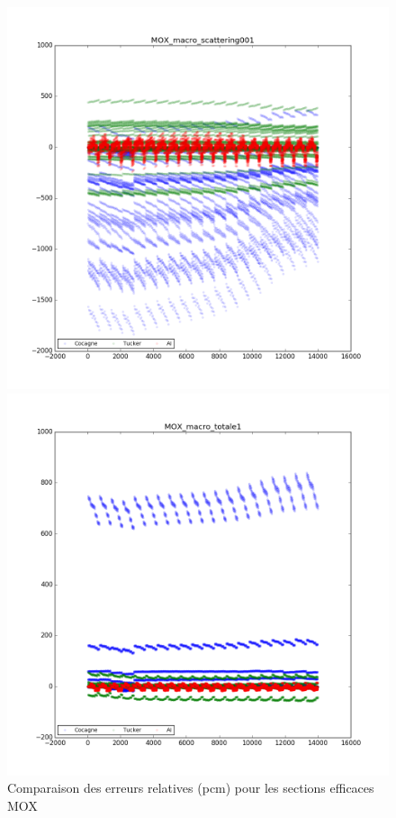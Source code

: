 \begin{center}
\begin{figure}[h]
\begin{minipage}[b]{0.5\linewidth}
   \end{minipage}
	 \begin{minipage}[b]{0.5\linewidth}
			\centering \includegraphics[scale=0.3]{images/MOX/MOX_macro_scattering001.png}
	 \end{minipage}
	 \begin{minipage}[b]{0.5\linewidth}
			\centering \includegraphics[scale=0.3]{images/MOX/MOX_macro_totale1.png}
	 \end{minipage}
	 \caption{Comparaison des erreurs relatives (pcm) pour les sections efficaces MOX}
\end{figure}


\end{center}
